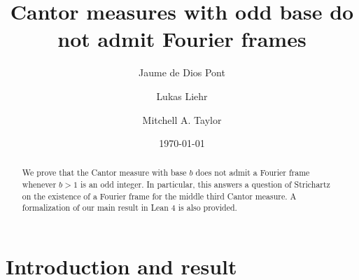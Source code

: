 \documentclass[reqno,a4paper,12pt]{amsart}
\begin{document}
\title[Cantor measures with odd base do not admit Fourier frames]{Cantor measures with odd base do not admit Fourier frames}

\author[Jaume de Dios Pont]{Jaume de Dios Pont}
\address{Center for Data Science, New York University, New York, New York 10011, USA}

\author[Lukas Liehr]{Lukas Liehr}
\address{Department of Mathematics, Bar-Ilan University, Ramat-Gan 5290002, Israel}

\author[Mitchell A. Taylor]{Mitchell A. Taylor}
\address{ Department of Mathematics\\
ETH Z\"urich, R\"amistrasse 101, 8092 Z\"urich, Switzerland}

\date{\today}

\begin{abstract}
We prove that the Cantor measure with base $b$ does not admit a Fourier frame whenever $b > 1$ is an odd integer. In particular, this answers a question of Strichartz on the existence of a Fourier frame for the middle third Cantor measure. A formalization of our main result in Lean 4 is also provided.
\end{abstract}

\maketitle

\section{Introduction and result}
\end{document}
